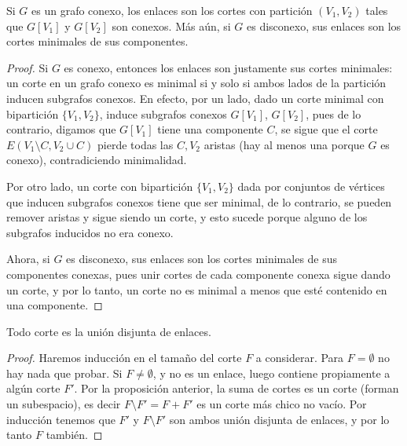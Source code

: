 \documentclass[../main.tex]{subfiles}
\begin{document}
\begin{proposition}\label{proposition:caracterizacion de enlaces en grafos conexos}
Si $G$ es un grafo conexo, los enlaces son los cortes con partición $(V_1, V_2)$ tales que $G[V_1]$ y $G[V_2]$ son conexos. Más aún, si $G$ es disconexo, sus enlaces son los cortes minimales de sus componentes.
\end{proposition}
\begin{proof}
Si $G$ es conexo, entonces los enlaces son justamente sus cortes minimales: un corte en un grafo conexo es minimal si y solo si ambos lados de la partición inducen subgrafos conexos. En efecto, por un lado, dado un corte minimal con bipartición $\{V_1,V_2\}$, induce subgrafos conexos $G[V_1]$, $G[V_2]$, pues de lo contrario, digamos que $G[V_1]$ tiene una componente $C$, se sigue que el corte $E(V_1 \setminus C, V_2 \cup C)$ pierde todas las $C,V_2$ aristas (hay al menos una porque $G$ es conexo), contradiciendo minimalidad.

 Por otro lado, un corte con bipartición $\{V_1,V_2\}$ dada por conjuntos de vértices que inducen subgrafos conexos tiene que ser minimal, de lo contrario, se pueden remover aristas y sigue siendo un corte, y esto sucede porque alguno de los subgrafos inducidos no era conexo.

 Ahora, si $G$ es disconexo, sus enlaces son los cortes minimales de sus componentes conexas, pues unir cortes de cada componente conexa sigue dando un corte, y por lo tanto, un corte no es minimal a menos que esté contenido en una componente.
\end{proof}

\begin{lemma}
Todo corte es la unión disjunta de enlaces.
\end{lemma}
\begin{proof}
Haremos inducción en el tamaño del corte $F$ a considerar. Para $F = \emptyset$ no hay nada que probar. Si $F \neq \emptyset$, y no es un enlace, luego contiene propiamente a algún corte $F'$. Por la proposición anterior, la suma de cortes es un corte (forman un subespacio), es decir $F \setminus F' = F + F'$ es un corte más chico no vacío. Por inducción tenemos que $F'$ y $F \setminus F'$ son ambos unión disjunta de enlaces, y por lo tanto $F$ también.
\end{proof}
\end{document}
